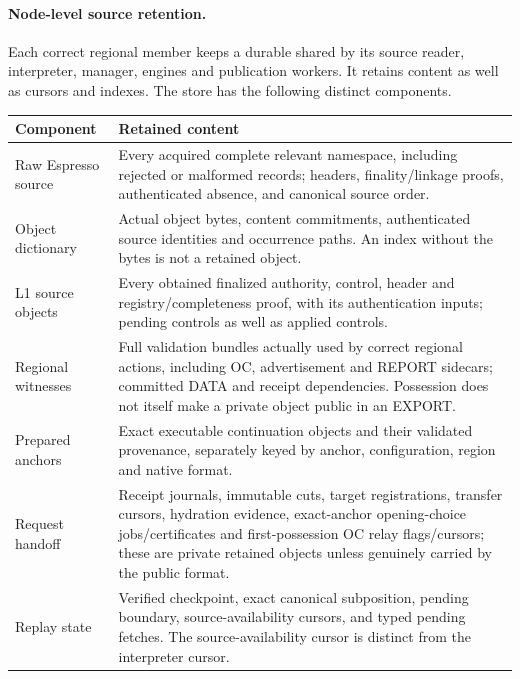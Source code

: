 \paragraph{Node-level source retention.}
\label{sec:source-step}
\label{sec:source-retention}
Each correct regional member keeps a durable  shared
by its source reader, interpreter, manager, engines and publication
workers. It retains content as well as cursors and indexes. The store
has the following distinct components.
\begin{table}[htbp]\centering\small
\begin{tabularx}{\linewidth}{@{}>{\raggedright\arraybackslash}p{.24\linewidth}Y@{}}\toprule
Component & Retained content\\\midrule
Raw Espresso source & Every acquired complete relevant namespace,
including rejected or malformed records; headers, finality/linkage
proofs, authenticated absence, and canonical source order.\\
Object dictionary & Actual object bytes, content commitments,
authenticated source identities and occurrence paths. An index without
the bytes is not a retained object.\\
L1 source objects & Every obtained finalized authority, control,
header and registry/completeness proof, with its authentication inputs;
pending controls as well as applied controls.\\
Regional witnesses & Full validation bundles actually used by correct
regional actions, including OC, advertisement and REPORT sidecars;
committed DATA and receipt dependencies. Possession
does not itself make a private object public in an EXPORT.\\
Prepared anchors & Exact executable continuation objects and their
validated provenance, separately keyed by anchor, configuration,
region and native format.\\
Request handoff & Receipt journals, immutable cuts, target registrations,
transfer cursors, hydration evidence, exact-anchor opening-choice
jobs/certificates and first-possession OC relay flags/cursors; these are private retained objects unless genuinely
carried by the public format.\\
Replay state & Verified checkpoint, exact canonical subposition,
pending boundary, source-availability cursors, and typed pending fetches.
The source-availability cursor is distinct from the interpreter cursor.\\\bottomrule
\end{tabularx}
\end{table}


